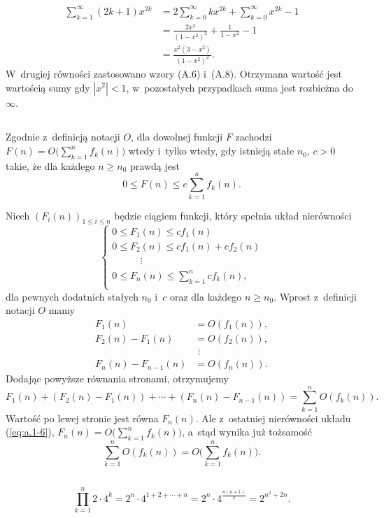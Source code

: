 \subsection{} %
\begin{align*}
	\sum_{k=1}^\infty(2k+1)x^{2k} &= 2\sum_{k=0}^\infty kx^{2k}+\sum_{k=0}^\infty x^{2k}-1 \\
	&= \frac{2x^2}{(1-x^2)^2}+\frac{1}{1-x^2}-1 \\
	&= \frac{x^2(3-x^2)}{(1-x^2)^2}.
\end{align*}
W~drugiej równości zastosowano wzory (A.6) i~(A.8). Otrzymana wartość jest wartością sumy gdy $|x^2|<1$, w~pozostałych przypadkach suma jest rozbieżna do $\infty$.

\subsection{} %
Zgodnie z~definicją notacji $O$, dla dowolnej funkcji $F$ zachodzi $F(n) = O\bigl(\sum_{k=1}^nf_k(n)\bigr)$ wtedy i~tylko wtedy, gdy istnieją stałe $n_0$, $c>0$ takie, że dla każdego $n\ge n_0$ prawdą jest
\[
	0\le F(n)\le c\sum_{k=1}^n f_k(n).
\]

Niech $(F_i(n))_{1\le i\le n}$ będzie ciągiem funkcji, który spełnia układ nierówności
\[
	\begin{cases}
		0 \le F_1(n) \le cf_1(n) \\
		0 \le F_2(n) \le cf_1(n)+cf_2(n) \\
		\phantom{0 \le F_2} \vdots \\
		0 \le F_n(n) \le \sum_{k=1}^ncf_k(n), \\
	\end{cases} \label{eq:a.1-6}
\]
dla pewnych dodatnich stałych $n_0$ i~$c$ oraz dla każdego $n\ge n_0$. Wprost z~definicji notacji $O$ mamy
\begin{align*}
	F_1(n) &= O(f_1(n)),\\
	F_2(n)-F_1(n) &= O(f_2(n)),\\
	& \,\,\vdots \\
	F_n(n)-F_{n-1}(n) &= O(f_n(n)).
\end{align*}
Dodając powyższe równania stronami, otrzymujemy
\[
	F_1(n)+(F_2(n)-F_1(n))+\cdots+(F_n(n)-F_{n-1}(n)) = \sum_{k=1}^nO(f_k(n)).
\]
Wartość po lewej stronie jest równa $F_n(n)$. Ale z~ostatniej nierówności układu (\ref{eq:a.1-6}), $F_n(n) = O\bigl(\sum_{k=1}^nf_k(n)\bigr)$, a~stąd wynika już tożsamość
\[
	\sum_{k=1}^nO(f_k(n)) = O\biggl(\sum_{k=1}^nf_k(n)\biggr).
\]

\subsection{} %
\[
	\prod_{k=1}^n2\cdot 4^k = 2^n\cdot 4^{1+2+\cdots+n} = 2^n\cdot 4^{\frac{n(n+1)}{2}} = 2^{n^2+2n}.
\]

